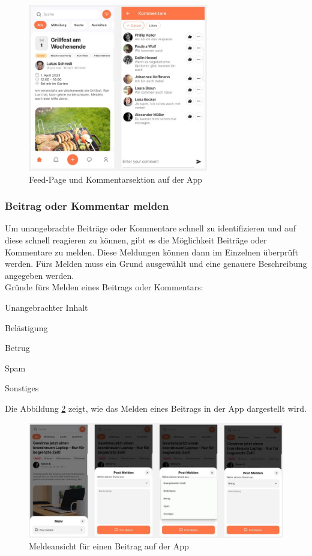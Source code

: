 \begin{figure}[H]
  \centering
  \includegraphics[width=0.7\textwidth]{pics/feed-and-comment-section.JPG}
  \caption{Feed-Page und Kommentarsektion auf der App}
  \label{fig:feed-comment}
\end{figure}

\subsubsection{Beitrag oder Kommentar melden}
Um unangebrachte Beiträge oder Kommentare schnell zu identifizieren und auf diese schnell reagieren zu können, gibt es die Möglichkeit Beiträge oder Kommentare zu melden. Diese Meldungen können dann im Einzelnen überprüft werden. Fürs Melden muss ein Grund ausgewählt und eine genauere Beschreibung angegeben werden.
\\
Gründe fürs Melden eines Beitrags oder Kommentars:

\begin{compactitem}
  \item Unangebrachter Inhalt
  \item Belästigung
  \item Betrug
  \item Spam
  \item Sonstiges
\end{compactitem}

Die Abbildung \ref{fig:report-post} zeigt, wie das Melden eines Beitrags in der App dargestellt wird.

\begin{figure}[H]
  \centering
  \includegraphics[width=1\textwidth]{pics/report-post.JPG}
  \caption{Meldeansicht für einen Beitrag auf der App}
  \label{fig:report-post}
\end{figure}


